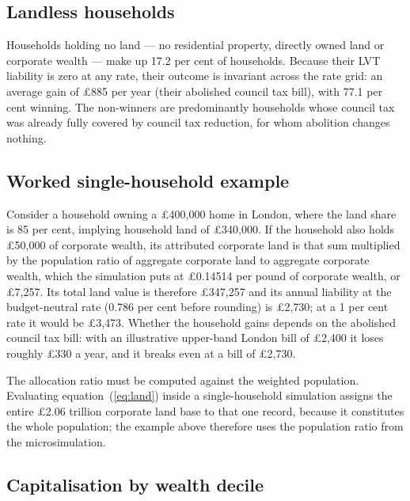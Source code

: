 \subsection{Landless households}

Households holding no land --- no residential property, directly owned land or corporate wealth --- make up 17.2 per cent of households. Because their LVT liability is zero at any rate, their outcome is invariant across the rate grid: an average gain of \pounds 885 per year (their abolished council tax bill), with 77.1 per cent winning. The non-winners are predominantly households whose council tax was already fully covered by council tax reduction, for whom abolition changes nothing.

\subsection{Worked single-household example}

Consider a household owning a \pounds 400{,}000 home in London, where the land share is 85 per cent, implying household land of \pounds 340{,}000. If the household also holds \pounds 50{,}000 of corporate wealth, its attributed corporate land is that sum multiplied by the population ratio of aggregate corporate land to aggregate corporate wealth, which the simulation puts at \pounds 0.14514 per pound of corporate wealth, or \pounds 7{,}257. Its total land value is therefore \pounds 347{,}257 and its annual liability at the budget-neutral rate (0.786 per cent before rounding) is \pounds 2{,}730; at a 1 per cent rate it would be \pounds 3{,}473. Whether the household gains depends on the abolished council tax bill: with an illustrative upper-band London bill of \pounds 2{,}400 it loses roughly \pounds 330 a year, and it breaks even at a bill of \pounds 2{,}730.

The allocation ratio must be computed against the weighted population. Evaluating equation~(\ref{eq:land}) inside a single-household simulation assigns the entire \pounds 2.06 trillion corporate land base to that one record, because it constitutes the whole population; the example above therefore uses the population ratio from the microsimulation.

\subsection{Capitalisation by wealth decile}

